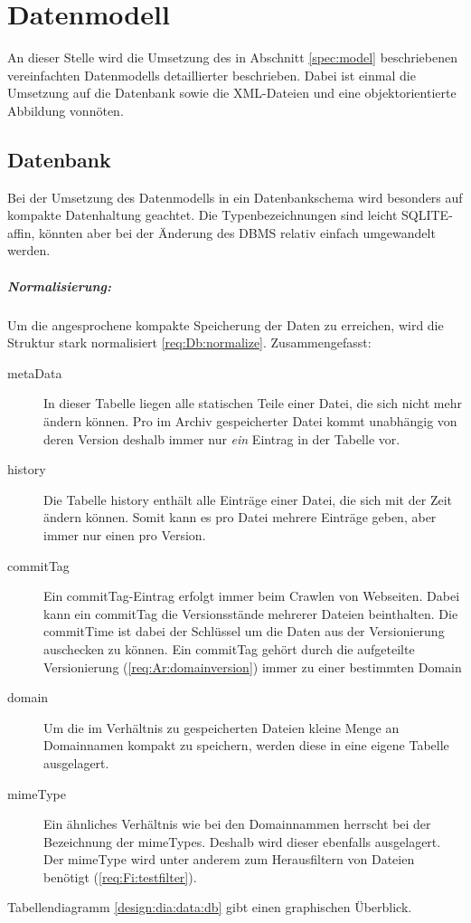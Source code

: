 \chapter{Datenmodell}
\liable{\cii}
An dieser Stelle wird die Umsetzung des in Abschnitt \ref{spec:model} 
beschriebenen vereinfachten Datenmodells detaillierter beschrieben. 
Dabei ist einmal die Umsetzung auf die Datenbank sowie die XML-Dateien und eine objektorientierte
Abbildung vonnöten.

\section{Datenbank}
Bei der Umsetzung des Datenmodells in ein Datenbankschema wird besonders auf kompakte Datenhaltung geachtet. 
Die Typenbezeichnungen sind leicht SQLITE-affin, könnten aber bei der Änderung des DBMS relativ einfach umgewandelt werden.
\paragraph{Normalisierung:} Um die angesprochene kompakte Speicherung der Daten zu erreichen,
wird die Struktur stark normalisiert \ref{req:Db:normalize}. Zusammengefasst:
\begin{description}
	\item [metaData]
		In dieser Tabelle liegen alle statischen Teile einer Datei, die sich nicht mehr
		ändern können. 
		Pro im Archiv gespeicherter Datei kommt unabhängig von deren Version deshalb 
		immer nur \emph{ein} Eintrag in der Tabelle vor.
	\item [history]
		Die Tabelle history enthält alle Einträge einer Datei, die sich mit der Zeit ändern
		können. Somit kann es pro Datei mehrere Einträge geben, aber immer nur einen pro Version.
	\item [commitTag]
		Ein commitTag-Eintrag erfolgt immer beim Crawlen von Webseiten. Dabei kann ein
		commitTag die Versionsstände mehrerer Dateien beinthalten.
		Die commitTime ist dabei der Schlüssel um die Daten aus der Versionierung
		auschecken zu können.
		Ein commitTag gehört durch die aufgeteilte Versionierung (\ref{req:Ar:domainversion}) immer zu einer bestimmten Domain
	\item [domain]
		Um die im Verhältnis zu gespeicherten Dateien kleine Menge an Domainnamen kompakt zu speichern,
		werden diese in eine eigene Tabelle ausgelagert.
	\item [mimeType]
		Ein ähnliches Verhältnis wie bei den Domainnammen herrscht bei der Bezeichnung der mimeTypes.
		Deshalb wird dieser ebenfalls ausgelagert.
		Der mimeType wird unter anderem zum Herausfiltern von Dateien benötigt (\ref{req:Fi:testfilter}).
\end{description}
Tabellendiagramm \ref{design:dia:data:db} gibt einen graphischen Überblick.
